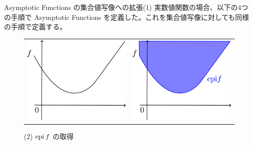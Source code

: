 \documentclass[aspectratio=169, dvipdfmx, 11pt]{beamer} %
\newcommand{\Epigraph}[1]{\text{epi\:${#1}$}} %
\begin{document}
\begin{frame}{Asymptotic Functions の集合値写像への拡張(1)}
  実数値関数の場合、以下の4つの手順で Asymptotic Functions を定義した。これを集合値写像に対しても同様の手順で定義する。

  \begin{figure}[htbp]
    \begin{tabular}{cc}
      \begin{minipage}[t]{0.45\hsize}
        \centering
        \includegraphics[keepaspectratio, scale=0.06]{figures/asymptotic_function_def/graph_base.eps}
        \caption{(1) $f$ の定義}
      \end{minipage} &
      \begin{minipage}[t]{0.45\hsize}
        \centering
        \includegraphics[keepaspectratio, scale=0.06]{figures/asymptotic_function_def/asymptotic_function_epigraph.eps}
        \caption{(2) $\Epigraph{f}$ の取得}
      \end{minipage} \\


\end{tabular}
\end{figure}
\end{frame}
\end{document}
